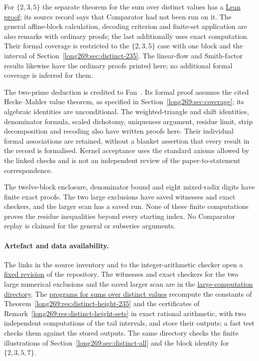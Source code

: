For $\{2,3,5\}$ the separate theorem for the sum over distinct values has a
\href{\distinctheightlean\#L689}{Lean proof}; its source record says
that Comparator had not been run on it. The general affine-block calculation,
decoding criterion and finite-set application are also remarks with
ordinary proofs; the last additionally uses exact computation. Their
formal coverage is restricted to the $\{2,3,5\}$ case with one block
and the interval of Section~\ref{long269:sec:distinct-235}.
The linear-flow and Smith-factor results likewise have the ordinary
proofs printed here; no additional formal coverage is inferred for them.

The two-prime deduction is credited to Fan~\cite{fan2026comment}.
Its formal proof assumes the cited Hecke--Mahler value theorem, as specified
in Section~\ref{long269:sec:coverage}; its algebraic identities are
unconditional. The weighted-triangle and shift identities, denominator
formula, scaled dichotomy, uniqueness argument, residue limit, strip
decomposition and recoding also have written proofs here. Their individual
formal associations are retained, without a blanket assertion that every
result in the record is formalised. Kernel acceptance uses the standard
axioms allowed by the linked checks and is not an independent review of
the paper-to-statement correspondence.

The twelve-block enclosure, denominator bound and eight mixed-radix digits
have finite exact proofs. The two large exclusions have saved witnesses
and exact checkers, and the larger scan has a saved run. None of these
finite computations proves the residue inequalities beyond every starting
index. No Comparator replay is claimed for the general or subseries
arguments.

\paragraph{Artefact and data availability.} The links in the
source inventory and to the integer-arithmetic checker open a
\href{\sourceurl}{fixed revision} of the repository.  The
witnesses and exact checkers for the two large numerical exclusions and
the saved larger scan are in the
\href{https://github.com/wcook04/plectis-erdos/tree/f757115e03bebe5c04431a147da559015c680a37/research/experiments/erdos269/large-computations}{large-computation directory}.
The \href{\distinctheighturl}{programs for sums over distinct values} recompute the
constants of Theorem~\ref{long269:res:distinct-height-235} and the
certificates of Remark~\ref{long269:res:distinct-height-sets} in exact
rational arithmetic, with two independent computations of the tail
intervals, and store their outputs; a fast test checks them against the
stored outputs.  The same directory checks the finite illustrations of
Section~\ref{long269:sec:distinct-all} and the block identity for
$\{2,3,5,7\}$.

